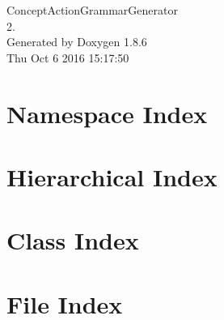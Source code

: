 \documentclass[twoside]{book}
\newcommand{\clearemptydoublepage}{%
  \newpage{\pagestyle{empty}\cleardoublepage}%
}
\begin{document}
\hypersetup{pageanchor=false}
\begin{titlepage}
\vspace*{7cm}
\begin{center}%
{\Large Concept\-Action\-Grammar\-Generator \\[1ex]\large 2. }\\
\vspace*{1cm}
{\large Generated by Doxygen 1.8.6}\\
\vspace*{0.5cm}
{\small Thu Oct 6 2016 15:17:50}\\
\end{center}
\end{titlepage}
\clearemptydoublepage
\tableofcontents
\clearemptydoublepage
{}
\hypersetup{pageanchor=true}

\chapter{Namespace Index}

\chapter{Hierarchical Index}

\chapter{Class Index}

\chapter{File Index}

\end{document}
